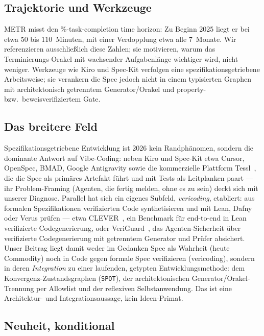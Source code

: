 \documentclass[11pt,a4paper]{article}
\theoremstyle{definition}
\theoremstyle{remark}
\begin{document}
\subsection{Trajektorie und Werkzeuge}
\label{sec:related-trajektorie}

METR \cite{metr2025} misst den \%-task-completion time horizon\grqq: Zu
Beginn 2025 liegt er bei etwa $50$ bis $110$~Minuten, mit einer Verdopplung etwa
alle $7$~Monate. Wir referenzieren ausschließlich diese Zahlen; sie motivieren,
warum das Terminierungs-Orakel mit wachsender Aufgabenlänge wichtiger wird, nicht
weniger. Werkzeuge wie Kiro und Spec-Kit verfolgen eine
spezifikationsgetriebene Arbeitsweise; sie verankern die Spec jedoch nicht in
einem typisierten Graphen mit architektonisch getrenntem Generator/Orakel und
property- bzw.\ beweisverifiziertem Gate.

\subsection{Das breitere Feld}
\label{sec:related-feld}

Spezifikationsgetriebene Entwicklung ist 2026 kein Randphänomen, sondern die
dominante Antwort auf \glqq Vibe-Coding\grqq: neben Kiro und Spec-Kit etwa Cursor,
OpenSpec, BMAD, Google Antigravity sowie die kommerzielle Plattform
Tessl~\cite{tessl2026}, die die Spec als primäres Artefakt führt und mit Tests als
Leitplanken paart --- ihr Problem-Framing (Agenten, die \glqq fertig\grqq{} melden,
ohne es zu sein) deckt sich mit unserer Diagnose. Parallel hat sich ein eigenes
Subfeld, \emph{vericoding}, etabliert: aus formalen Spezifikationen verifizierten
Code synthetisieren und mit Lean, Dafny oder Verus prüfen --- etwa
CLEVER~\cite{clever2025}, ein Benchmark für end-to-end in Lean verifizierte
Codegenerierung, oder VeriGuard~\cite{veriguard2025}, das Agenten-Sicherheit über
verifizierte Codegenerierung mit getrenntem Generator und Prüfer absichert. Unser
Beitrag liegt damit weder im Gedanken \glqq Spec als Wahrheit\grqq{} (heute
Commodity) noch in \glqq Code gegen formale Spec verifizieren\grqq{} (vericoding),
sondern in deren \emph{Integration} zu einer laufenden, getypten
Entwicklungsmethode: dem Konvergenz-Zustandsgraphen (\texttt{SPOT}), der
architektonischen Generator/Orakel-Trennung per Allowlist und der reflexiven
Selbstanwendung. Das ist eine Architektur- und Integrationsaussage, kein
Ideen-Primat.

\subsection{Neuheit, konditional}
\label{sec:related-neuheit}
\end{document}
